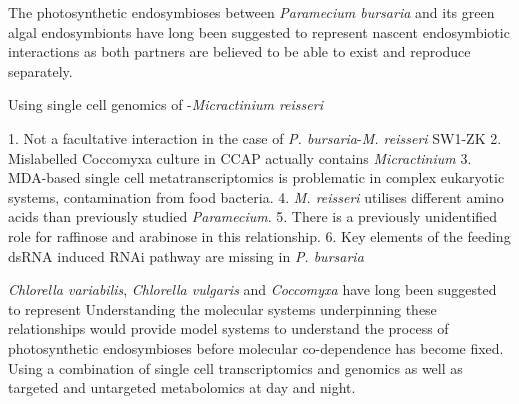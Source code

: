 
The photosynthetic endosymbioses between \textit{Paramecium bursaria} and 
its green algal endosymbionts have long been suggested to represent 
nascent endosymbiotic interactions as both partners are believed
to be able to exist and reproduce separately.

Using single cell genomics of -\textit{Micractinium
reisseri} 


1. Not a facultative interaction in the case of \textit{P. bursaria}-\textit{M. reisseri} SW1-ZK
2. Mislabelled Coccomyxa culture in CCAP actually contains \textit{Micractinium}
3. MDA-based single cell metatranscriptomics is problematic in complex
eukaryotic systems, contamination from food bacteria.
4. \textit{M. reisseri} utilises different amino acids than previously studied
\textit{Paramecium}. 
5. There is a previously unidentified role for raffinose and arabinose in this relationship.
6. Key elements of the feeding dsRNA induced RNAi pathway are missing in \textit{P. bursaria}



\textit{Chlorella variabilis}, \textit{Chlorella vulgaris} and \textit{Coccomyxa} have long 
been suggested to represent 
Understanding the molecular systems underpinning these relationships would provide
model systems to understand the process of photosynthetic endosymbioses before molecular
co-dependence has become fixed.  Using a combination of single cell transcriptomics and genomics
as well as targeted and untargeted metabolomics at day and night.
